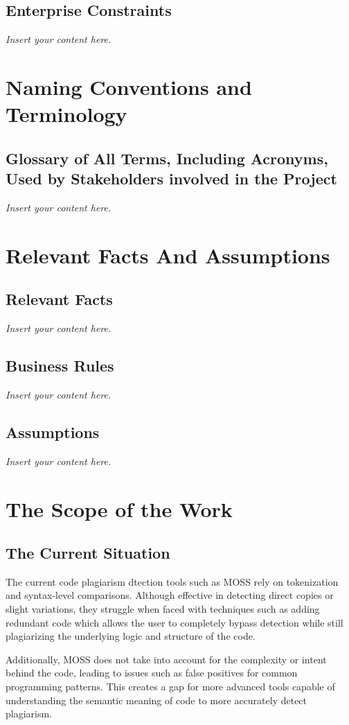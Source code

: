 \documentclass[12pt]{article}
\newcommand{\lips}{\textit{Insert your content here.}}
\begin{document}
\subsection{Enterprise Constraints}
\lips

\section{Naming Conventions and Terminology}
\subsection{Glossary of All Terms, Including Acronyms, Used by Stakeholders
involved in the Project}
\lips

\section{Relevant Facts And Assumptions}
\subsection{Relevant Facts}
\lips
\subsection{Business Rules}
\lips
\subsection{Assumptions}
\lips

\section{The Scope of the Work}
\subsection{The Current Situation}
The current code plagiarism dtection tools such as MOSS rely on tokenization and syntax-level comparisons. Although effective
in detecting direct copies or slight variations, they struggle when faced with techniques such as adding redundant code which
allows the user to completely bypass detection while still plagiarizing the underlying logic and structure of the code.

Additionally, MOSS does not take into account for the complexity or intent behind the code, leading to issues such as false
positives for common programming patterns. This creates a gap for more advanced tools capable of understanding the semantic 
meaning of code to more accurately detect plagiarism.
\end{document}
